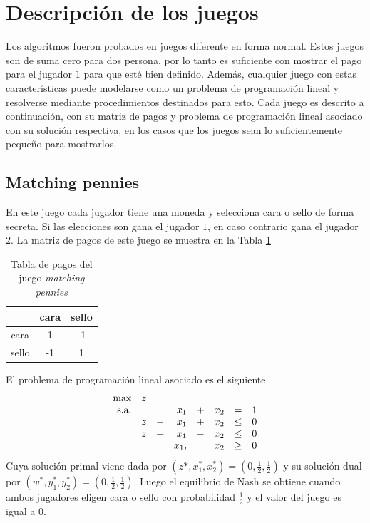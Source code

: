 \section{Descripción de los juegos}

Los algoritmos fueron probados en juegos diferente en forma normal. Estos juegos son de suma cero para dos persona, por lo tanto es suficiente con mostrar el pago para el jugador $1$ para que esté bien definido. Además, cualquier juego con estas características puede modelarse como un problema de programación lineal y resolverse mediante procedimientos destinados para esto. Cada juego es descrito a continuación, con su matriz de pagos y problema de programación lineal asociado con su solución respectiva, en los casos que los juegos sean lo suficientemente pequeño para mostrarlos.

\subsection{Matching pennies}
En este juego cada jugador tiene una moneda y selecciona cara o sello de forma secreta. Si las elecciones son gana el jugador $1$, en caso contrario gana el jugador $2$. La matriz de pagos de este juego se muestra en la Tabla \ref{table:pagos-matching-pennies}
\begin{table}[ht]
\begin{center}
\caption[Tabla de pagos del juego matching pennies]{Tabla de pagos del juego \textit{matching pennies}}
\label{table:pagos-matching-pennies}
\begin{tabular}{ c | c | c |}
 & cara & sello  \\ \hline
 cara  &  1 & -1 \\ \hline
 sello & -1 &  1 \\ \hline
\end{tabular}
\end{center}
\end{table}

El problema de programación lineal asociado es el siguiente
\begin{equation}
\begin{array}{r r r r r r r r}
\max  & z &  & & & & &\\
\text{s.a.}  
&   &   & x_1  & + & x_2 & = & 1 \\
& z & - & x_1  & + & x_2 & \leq & 0 \\
& z & + & x_1  & - & x_2 & \leq & 0 \\
&   &   & x_1, &   & x_2 & \geq & 0
\end{array}
\end{equation}
Cuya solución primal viene dada por $(z*, x_1^*, x_2^*) = (0, \frac{1}{2}, \frac{1}{2})$ y su solución dual por $(w^*, y^*_1, y^*_2) = (0, \frac{1}{2}, \frac{1}{2})$. Luego el equilibrio de Nash se obtiene cuando ambos jugadores eligen cara o sello con probabilidad $\frac{1}{2}$ y el valor del juego es igual a $0$.

